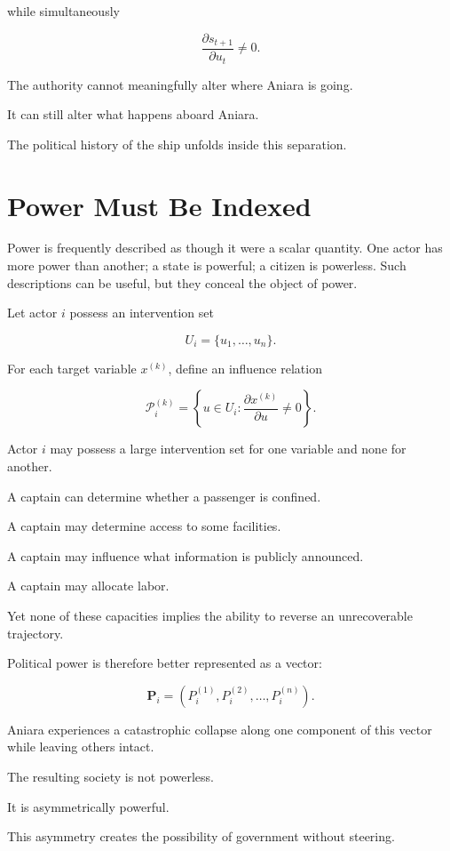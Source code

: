 \documentclass[11pt,oneside]{book}
\theoremstyle{definition}
\theoremstyle{remark}
\begin{document}
while simultaneously

\[
\frac{\partial s_{t+1}}{\partial u_t}\neq0.
\]

The authority cannot meaningfully alter where Aniara is going.

It can still alter what happens aboard Aniara.

The political history of the ship unfolds inside this separation.

\section{Power Must Be Indexed}

Power is frequently described as though it were a scalar quantity. One actor has more power than another; a state is powerful; a citizen is powerless. Such descriptions can be useful, but they conceal the object of power.

Let actor \(i\) possess an intervention set

\[
U_i=\{u_1,\ldots,u_n\}.
\]

For each target variable \(x^{(k)}\), define an influence relation

\[
\mathcal P_i^{(k)}
=
\left\{
u\in U_i:
\frac{\partial x^{(k)}}{\partial u}\neq0
\right\}.
\]

Actor \(i\) may possess a large intervention set for one variable and none for another.

A captain can determine whether a passenger is confined.

A captain may determine access to some facilities.

A captain may influence what information is publicly announced.

A captain may allocate labor.

Yet none of these capacities implies the ability to reverse an unrecoverable trajectory.

Political power is therefore better represented as a vector:

\[
\mathbf P_i
=
\left(
P_i^{(1)},
P_i^{(2)},
\ldots,
P_i^{(n)}
\right).
\]

Aniara experiences a catastrophic collapse along one component of this vector while leaving others intact.

The resulting society is not powerless.

It is asymmetrically powerful.

This asymmetry creates the possibility of government without steering.
\end{document}

